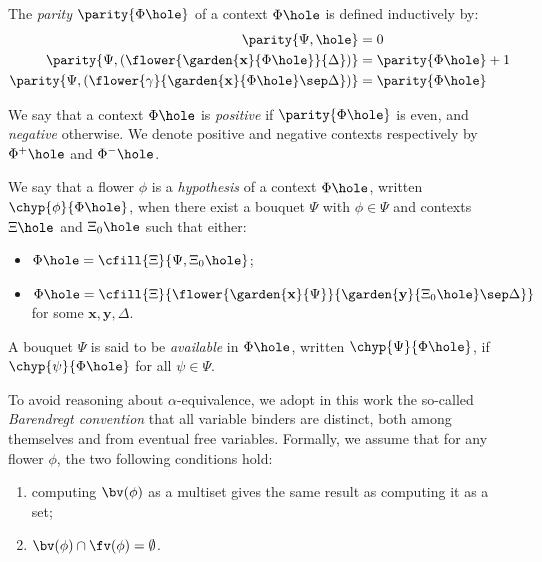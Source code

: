 \begin{definition}[Parity]
  The \emph{parity} $\parity{\Phi\hole}$ of a context $\Phi\hole$ is defined inductively by:
  \begin{align*}
    \parity{\Psi, \hole} &= 0 \\
    \parity{\Psi, (\flower{\garden{\mathbf{x}}{\Phi\hole}}{\Delta})} &= \parity{\Phi\hole} + 1 \\
    \parity{\Psi, (\flower{\gamma}{\garden{\mathbf{x}}{\Phi\hole} \sep \Delta})} &= \parity{\Phi\hole}
  \end{align*}
\end{definition}

\begin{definition}[Polarity]
  We say that a context $\Phi\hole$ is \emph{positive} if $\parity{\Phi\hole}$ is even, and
  \emph{negative} otherwise. We denote positive and negative contexts
  respectively by $\Phi^+\hole$ and $\Phi^-\hole$.
\end{definition}

\begin{definition}[Hypothesis]
  We say that a flower $\phi$ is a \emph{hypothesis} of a context $\Phi\hole$, written
  $\chyp{\phi}{\Phi\hole}$, when there exist a bouquet $\Psi$ with $\phi \in \Psi$ and
  contexts $\Xi\hole$ and $\Xi_0\hole$ such that either:
  \begin{itemize}
    \item $\Phi\hole = \cfill{\Xi}{\Psi, \Xi_0\hole}$;
    \item $\Phi\hole =
    \cfill{\Xi}{\flower{\garden{\mathbf{x}}{\Psi}}{\garden{\mathbf{y}}{\Xi_0\hole}
    \sep \Delta}}$ for some $\mathbf{x}, \mathbf{y}, \Delta$.
  \end{itemize}
  A bouquet $\Psi$ is said to be \emph{available} in $\Phi\hole$, written
  $\chyp{\Psi}{\Phi\hole}$, if $\chyp{\psi}{\Phi\hole}$ for all $\psi \in \Psi$.
\end{definition}

To avoid reasoning about $\alpha$-equivalence, we adopt in this work the
so-called \emph{Barendregt convention} that all variable binders are distinct,
both among themselves and from eventual free variables. Formally, we assume that
for any flower $\phi$, the two following conditions hold:
\begin{enumerate}
  \item computing $\bv(\phi)$ as a multiset gives the same result as computing
  it as a set;
  \item $\bv(\phi) \cap \fv(\phi) = \emptyset$.
\end{enumerate} 

